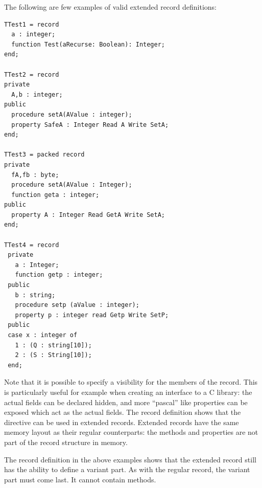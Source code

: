 The following are few examples of valid extended record definitions:
\begin{verbatim}
TTest1 = record
  a : integer;
  function Test(aRecurse: Boolean): Integer;
end;

TTest2 = record
private
  A,b : integer;
public
  procedure setA(AValue : integer);
  property SafeA : Integer Read A Write SetA;
end;

TTest3 = packed record
private
  fA,fb : byte;
  procedure setA(AValue : Integer);
  function geta : integer;
public
  property A : Integer Read GetA Write SetA;
end;

TTest4 = record
 private
   a : Integer;
   function getp : integer;
 public
   b : string;
   procedure setp (aValue : integer);
   property p : integer read Getp Write SetP;
 public
 case x : integer of
   1 : (Q : string[10]);
   2 : (S : String[10]);
 end;
\end{verbatim}
Note that it is possible to specify a visibility for the members of the
record. This is particularly useful for example when creating an interface
to a C library: the actual fields can be declared hidden, and more ``pascal''
like properties can be exposed which act as the actual fields.
The  record definition shows that the  directive can
be used in extended records. Extended records have the same memory layout as
their regular counterparts: the methods and properties are not part of the
record structure in memory.

The  record definition in the above examples shows that the
extended record still has the ability to define a variant part. As with the
regular record, the variant part must come last. It cannot contain methods.

